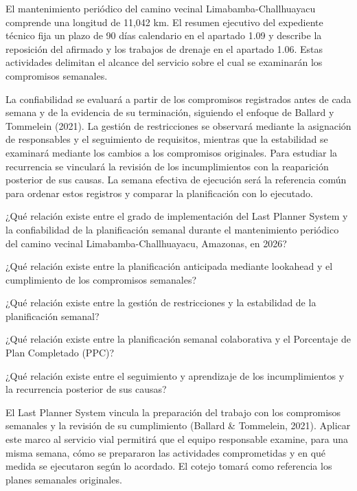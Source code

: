 \documentclass[12pt,a4paper]{article}
\begin{document}
El mantenimiento periódico del camino vecinal Limabamba-Challhuayacu comprende una longitud de 11,042 km. El resumen ejecutivo del expediente técnico fija un plazo de 90 días calendario en el apartado 1.09 y describe la reposición del afirmado y los trabajos de drenaje en el apartado 1.06. Estas actividades delimitan el alcance del servicio sobre el cual se examinarán los compromisos semanales.

La confiabilidad se evaluará a partir de los compromisos registrados antes de cada semana y de la evidencia de su terminación, siguiendo el enfoque de Ballard y Tommelein (2021). La gestión de restricciones se observará mediante la asignación de responsables y el seguimiento de requisitos, mientras que la estabilidad se examinará mediante los cambios a los compromisos originales. Para estudiar la recurrencia se vinculará la revisión de los incumplimientos con la reaparición posterior de sus causas. La semana efectiva de ejecución será la referencia común para ordenar estos registros y comparar la planificación con lo ejecutado.

¿Qué relación existe entre el grado de implementación del Last Planner System y la confiabilidad de la planificación semanal durante el mantenimiento periódico del camino vecinal Limabamba-Challhuayacu, Amazonas, en 2026?

\begin{listaTrasTitulo}
\item ¿Qué relación existe entre la planificación anticipada mediante lookahead y el cumplimiento de los compromisos semanales?
\item ¿Qué relación existe entre la gestión de restricciones y la estabilidad de la planificación semanal?
\item ¿Qué relación existe entre la planificación semanal colaborativa y el Porcentaje de Plan Completado (PPC)?
\item ¿Qué relación existe entre el seguimiento y aprendizaje de los incumplimientos y la recurrencia posterior de sus causas?
\end{listaTrasTitulo}

El Last Planner System vincula la preparación del trabajo con los compromisos semanales y la revisión de su cumplimiento (Ballard \& Tommelein, 2021). Aplicar este marco al servicio vial permitirá que el equipo responsable examine, para una misma semana, cómo se prepararon las actividades comprometidas y en qué medida se ejecutaron según lo acordado. El cotejo tomará como referencia los planes semanales originales.
\end{document}
